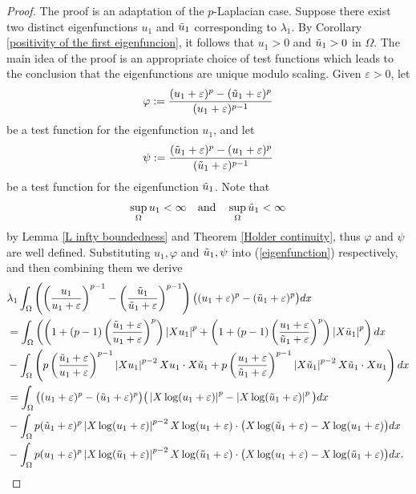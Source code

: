 \documentclass[a4paper,12pt,reqno]{amsart}
\renewcommand\eqref[1]{(\ref{#1})} %
\numberwithin{equation}{section}
\theoremstyle{plain}
\theoremstyle{definition}
\begin{document}
\begin{proof}
The proof is an adaptation of the $p$-Laplacian case. Suppose there exist two distinct eigenfunctions $u_{1}$ and $\Tilde{u}_{1}$ corresponding to $\lambda_{1}$. By Corollary \ref{positivity of the first eigenfuncion}, it follows that $u_{1}>0$ and $\Tilde{u}_{1}>0$ in $\Omega$. The main idea of the proof is an appropriate choice of test functions which leads to the conclusion that the eigenfunctions are unique modulo scaling. Given $\varepsilon>0$, let
\begin{equation*}
\varphi:=\frac{(u_{1}+\varepsilon)^{p}-(\Tilde{u}_{1}+\varepsilon)^{p}}{(u_{1}+\varepsilon)^{p-1}} 
\end{equation*}
be a test function for the eigenfunction $u_{1}$, and let
\begin{equation*}
\psi:=\frac{(\Tilde{u}_{1}+\varepsilon)^{p}-(u_{1}+\varepsilon)^{p}}{(\Tilde{u}_{1}+\varepsilon)^{p-1}}
\end{equation*}
be a test function for the eigenfunction $\Tilde{u}_{1}$. Note that 
$$\sup_{\Omega}u_{1}<\infty \quad \text{and}\quad\sup_{\Omega}\Tilde{u}_{1}<\infty$$
by Lemma \ref{L infty boundedness}  and Theorem \ref{Holder continuity}, thus $\varphi$ and $\psi$ are well defined. Substituting  $u_{1},\varphi$ and $\Tilde{u}_{1},\psi$ into  \eqref{eigenfunction} respectively, and then combining them we derive
\begin{equation}\label{long calculation}
\begin{aligned}
&\lambda_{1}\int_{\Omega}\left(\left(\frac{u_{1}}{u_{1}+\varepsilon}\right)^{p-1}-\left(\frac{\Tilde{u}_{1}}{\Tilde{u}_{1}+\varepsilon}\right)^{p-1}\right)\big((u_{1}+\varepsilon)^{p}-(\Tilde{u}_{1}+\varepsilon)^{p}\big) d x\\
&= \int_{\Omega}\left(\left(1+(p-1)\left(\frac{\Tilde{u}_{1}+\varepsilon}{u_{1}+\varepsilon}\right)^{p}\right)\left|X u_{1}\right|^{p}+\left(1+(p-1)\left(\frac{u_{1}+\varepsilon}{\Tilde{u}_{1}+\varepsilon}\right)^{p}\right)\left|X \Tilde{u}_{1}\right|^{p}\right) d x \\
&-\int_{\Omega}\left(p\left(\frac{\Tilde{u}_{1}+\varepsilon}{u_{1}+\varepsilon}\right)^{p-1}\left|X u_{1}\right|^{p-2} X u_{1} \cdot X \Tilde{u}_{1}+p\left(\frac{u_{1}+\varepsilon}{\Tilde{u}_{1}+\varepsilon}\right)^{p-1}\left|X \Tilde{u}_{1}\right|^{p-2} X \Tilde{u}_{1} \cdot X u_{1}\right) d x \\
&= \int_{\Omega}\big((u_{1}+\varepsilon)^{p}-(\Tilde{u}_{1}+\varepsilon)^{p}\big)\big(\left|X \log (u_{1}+\varepsilon)\right|^{p}-\left|X \log (\Tilde{u}_{1}+\varepsilon)\right|^{p}\big) d x \\
&-\int_{\Omega} p (\Tilde{u}_{1}+\varepsilon)^{p}\left|X \log (u_{1}+\varepsilon)\right|^{p-2} X \log (u_{1}+\varepsilon) \cdot\big(X \log (\Tilde{u}_{1}+\varepsilon)-X \log (u_{1}+\varepsilon)\big) d x \\
&-\int_{\Omega} p (u_{1}+\varepsilon)^{p}\left|X \log (\Tilde{u}_{1}+\varepsilon)\right|^{p-2} X \log (\Tilde{u}_{1}+\varepsilon) \cdot\big(X \log (u_{1}+\varepsilon)-X \log (\Tilde{u}_{1}+\varepsilon)\big) d x.
\end{aligned}
\end{equation}


\end{proof}
\end{document}
